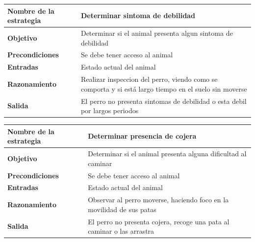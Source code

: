 \documentclass[a4paper,table,xcdraw]{article}
\begin{document}
\begin{longtable}{|m{100pt}|m{300pt}|}
\hline
\textbf{Nombre de la estrategia} & Determinar sintoma de debilidad                                                                       \\ \hline
\endhead
%
\textbf{Objetivo}                & Determinar si el animal presenta algun sintoma de debilidad                                           \\ \hline
\textbf{Precondiciones}          & Se debe tener acceso al animal                                                                        \\ \hline
\textbf{Entradas}                & Estado actual del animal                                                                              \\ \hline
\textbf{Razonamiento}            & Realizar inspeccion del perro, viendo como se comporta y si está largo tiempo en el suelo sin moverse \\ \hline
\textbf{Salida}                  & El perro no presenta sintomas de debilidad o esta debil por largos periodos                           \\ \hline
\end{longtable}

\begin{longtable}{|l|l|}
\hline
\textbf{Nombre de la estrategia} & Determinar presencia de cojera                                         \\ \hline
\endhead
%
\textbf{Objetivo}                & Determinar si el animal presenta alguna dificultad al caminar          \\ \hline
\textbf{Precondiciones}          & Se debe tener acceso al animal                                         \\ \hline
\textbf{Entradas}                & Estado actual del animal                                               \\ \hline
\textbf{Razonamiento}            & Observar al perro moverse, haciendo foco en la movilidad de sus patas  \\ \hline
\textbf{Salida}                  & El perro no presenta cojera, recoge una pata al caminar o las arrastra \\ \hline
\end{longtable}
\end{document}

